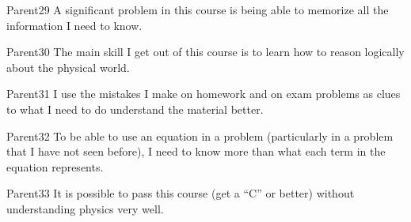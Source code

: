 \begin{question}{Parent29}
    \QuestionIndicative
    A significant problem in this course is being able to
        memorize all the information I need to know.
    \begin{choiceshoriz}[o]
    \end{choiceshoriz}
\end{question}

\begin{question}{Parent30}
    \QuestionIndicative
    The main skill I get out of this course is to learn how to reason
        logically about the physical world.
    \begin{choiceshoriz}[o]
    \end{choiceshoriz}
\end{question}

\begin{question}{Parent31}
    \QuestionIndicative
    I use the mistakes I make on homework and on exam problems as clues
        to what I need to do understand the material better.
    \begin{choiceshoriz}[o]
    \end{choiceshoriz}
\end{question}

\begin{question}{Parent32}
    \QuestionIndicative
    To be able to use an equation in a problem (particularly in a problem
        that I have not seen before), I need to know more than what each
        term in the equation represents.
    \begin{choiceshoriz}[o]
    \end{choiceshoriz}
\end{question}

\begin{question}{Parent33}
    \QuestionIndicative
    It is possible to pass this course (get a ``C'' or better) without
        understanding physics very well.
    \begin{choiceshoriz}[o]
    \end{choiceshoriz}
\end{question}

